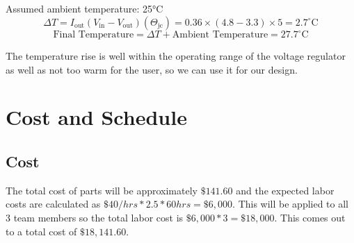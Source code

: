 \documentclass[12pt]{article}
\begin{document}
\noindent Assumed ambient temperature: 25°C 
\[
\Delta T = I_{\text{out}} (V_{\text{in}} - V_{\text{out}}) (\Theta_{\text{jc}}) = 0.36 \times (4.8 - 3.3) \times 5 = 2.7^\circ\text{C}
\]
\[
\text{Final Temperature} = \Delta T + \text{Ambient Temperature} = 27.7^\circ\text{C}
\]

\noindent The temperature rise is well within the operating range of the voltage regulator as well as not too warm for the user, so we can use it for our design.

\newpage
\section{Cost and Schedule}

\subsection{Cost}
The total cost of parts will be approximately $\$141.60$ and the expected labor costs are calculated as $\$40/hrs * 2.5 * 60 hrs = \$6,000$. This will be applied to all 3 team members so the total labor cost is $\$6,000 * 3 = \$18,000$. This comes out to a total cost of $\$18,141.60$.
\end{document}
